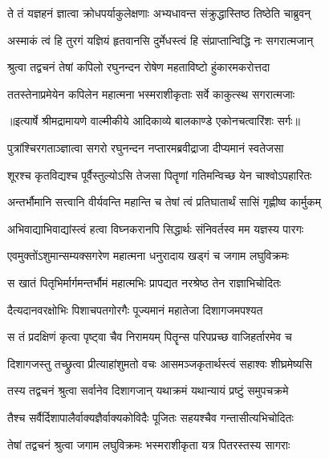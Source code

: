 \twolineshloka
{ते तं यज्ञहनं ज्ञात्वा क्रोधपर्याकुलेक्षणाः}
{अभ्यधावन्त संक्रुद्धास्तिष्ठ तिष्ठेति चाब्रुवन्} %

\twolineshloka
{अस्माकं त्वं हि तुरगं यज्ञियं हृतवानसि}
{दुर्मेधस्त्वं हि संप्राप्तान्विद्धि नः सगरात्मजान्} %

\twolineshloka
{श्रुत्वा तद्वचनं तेषां कपिलो रघुनन्दन}
{रोषेण महताविष्टो हुंकारमकरोत्तदा} %

\twolineshloka
{ततस्तेनाप्रमेयेन कपिलेन महात्मना}
{भस्मराशीकृताः सर्वे काकुत्स्थ सगरात्मजाः} %


{॥इत्यार्षे श्रीमद्रामायणे वाल्मीकीये आदिकाव्ये बालकाण्डे एकोनचत्वारिंशः सर्गः॥}


\twolineshloka
{पुत्रांश्चिरगताञ्ज्ञात्वा सगरो रघुनन्दन}
{नप्तारमब्रवीद्राजा दीप्यमानं स्वतेजसा} %

\twolineshloka
{शूरश्च कृतविद्यश्च पूर्वैस्तुल्योऽसि तेजसा}
{पितॄणां गतिमन्विच्छ येन चाश्वोऽपहारितः} %

\twolineshloka
{अन्तर्भौमानि सत्त्वानि वीर्यवन्ति महान्ति च}
{तेषां त्वं प्रतिघातार्थं सासिं गृह्णीष्व कार्मुकम्} %

\twolineshloka
{अभिवाद्याभिवाद्यांस्त्वं हत्वा विघ्नकरानपि}
{सिद्धार्थः संनिवर्तस्व मम यज्ञस्य पारगः} %

\twolineshloka
{एवमुक्तोंऽशुमान्सम्यक्सगरेण महात्मना}
{धनुरादाय खड्गं च जगाम लघुविक्रमः} %

\twolineshloka
{स खातं पितृभिर्मार्गमन्तर्भौमं महात्मभिः}
{प्रापद्यत नरश्रेष्ठ तेन राज्ञाभिचोदितः} %

\twolineshloka
{दैत्यदानवरक्षोभिः पिशाचपतगोरगैः}
{पूज्यमानं महातेजा दिशागजमपश्यत} %

\twolineshloka
{स तं प्रदक्षिणं कृत्वा पृष्ट्वा चैव निरामयम्}
{पितॄन्स परिपप्रच्छ वाजिहर्तारमेव च} %

\twolineshloka
{दिशागजस्तु तच्छ्रुत्वा प्रीत्याहांशुमतो वचः}
{आसमञ्जकृतार्थस्त्वं सहाश्वः शीघ्रमेष्यसि} %

\twolineshloka
{तस्य तद्वचनं श्रुत्वा सर्वानेव दिशागजान्}
{यथाक्रमं यथान्यायं प्रष्टुं समुपचक्रमे} %

\twolineshloka
{तैश्च सर्वैर्दिशापालैर्वाक्यज्ञैर्वाक्यकोविदैः}
{पूजितः सहयश्चैव गन्तासीत्यभिचोदितः} %

\twolineshloka
{तेषां तद्वचनं श्रुत्वा जगाम लघुविक्रमः}
{भस्मराशीकृता यत्र पितरस्तस्य सागराः} %


